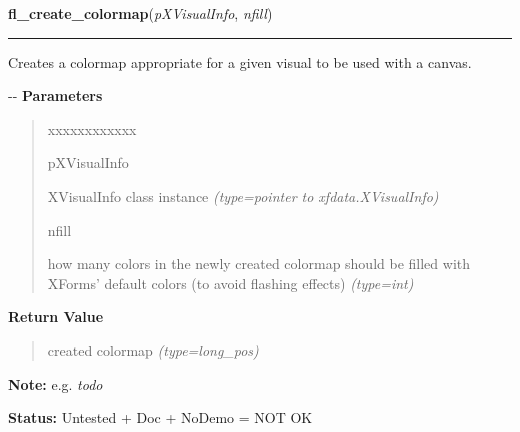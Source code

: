 \hspace{.8\funcindent}\begin{boxedminipage}{\funcwidth}

    \raggedright \textbf{fl\_create\_colormap}(\textit{pXVisualInfo}, \textit{nfill})

    \vspace{-1.5ex}

    \rule{\textwidth}{0.5\fboxrule}
\setlength{\parskip}{2ex}

Creates a colormap appropriate for a given visual to be used with
a canvas.

-{}-
\setlength{\parskip}{1ex}
      \textbf{Parameters}
      \vspace{-1ex}

      \begin{quote}
        \begin{Ventry}{xxxxxxxxxxxx}

          \item[pXVisualInfo]


XVisualInfo class instance
            {\it (type=pointer to xfdata.XVisualInfo)}

          \item[nfill]


how many colors in the newly created colormap should be filled with
XForms' default colors (to avoid flashing effects)
            {\it (type=int)}

        \end{Ventry}

      \end{quote}

      \textbf{Return Value}
    \vspace{-1ex}

      \begin{quote}

created colormap
      {\it (type=long\_pos)}

      \end{quote}

\textbf{Note:} 
e.g. \emph{todo}


\textbf{Status:} 
Untested + Doc + NoDemo = NOT OK


    \end{boxedminipage}

    \label{xformslib:flxbasic:fl_wingeometry}

    \vspace{0.5ex}

